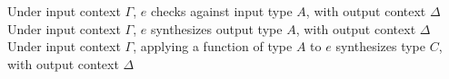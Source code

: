 \begin{figure*}[ht]
     {Under input context $\Gamma$, $e$ checks against input type $A$, 
     with output context $\Delta$} \\[1ex]
     {Under input context $\Gamma$, $e$ synthesizes output type $A$,
       with output context $\Delta$} \\[0.5ex]
     {Under input context $\Gamma$, applying a function of type $A$ to $e$ synthesizes type $C$, \\ with output context $\Delta$} \\
\end{figure*}
